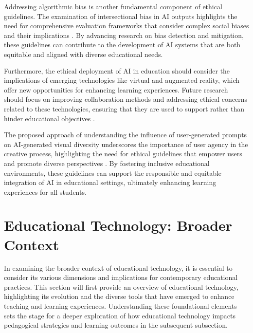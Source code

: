 Addressing algorithmic bias is another fundamental component of ethical guidelines. The examination of intersectional bias in AI outputs highlights the need for comprehensive evaluation frameworks that consider complex social biases and their implications \cite{bogoychev2020domaintranslationesenoisesynthetic}. By advancing research on bias detection and mitigation, these guidelines can contribute to the development of AI systems that are both equitable and aligned with diverse educational needs.



Furthermore, the ethical deployment of AI in education should consider the implications of emerging technologies like virtual and augmented reality, which offer new opportunities for enhancing learning experiences. Future research should focus on improving collaboration methods and addressing ethical concerns related to these technologies, ensuring that they are used to support rather than hinder educational objectives \cite{mcguffie2020radicalizationrisksgpt3advanced}.



The proposed approach of understanding the influence of user-generated prompts on AI-generated visual diversity underscores the importance of user agency in the creative process, highlighting the need for ethical guidelines that empower users and promote diverse perspectives \cite{palmini2024patternscreativityuserinput}. By fostering inclusive educational environments, these guidelines can support the responsible and equitable integration of AI in educational settings, ultimately enhancing learning experiences for all students.














\section{Educational Technology: Broader Context} \label{sec:Educational Technology: Broader Context}

In examining the broader context of educational technology, it is essential to consider its various dimensions and implications for contemporary educational practices. This section will first provide an overview of educational technology, highlighting its evolution and the diverse tools that have emerged to enhance teaching and learning experiences. Understanding these foundational elements sets the stage for a deeper exploration of how educational technology impacts pedagogical strategies and learning outcomes in the subsequent subsection. 





